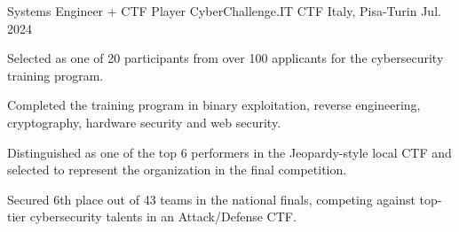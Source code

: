 

\begin{cventries}

  \cventry
    {Systems Engineer + CTF Player} %
    {CyberChallenge.IT CTF} %
    {Italy, Pisa-Turin} %
    {Jul. 2024} %
    {
      \begin{cvitems} %
        \item {Selected as one of 20 participants from over 100 applicants for the cybersecurity training program.}
        \item {Completed the training program in binary exploitation, reverse engineering, cryptography, hardware security and web security.}
        \item {Distinguished as one of the top 6 performers in the Jeopardy-style local CTF and selected to represent the organization in the final competition.}
        \item {Secured 6th place out of 43 teams in the national finals, competing against top-tier cybersecurity talents in an Attack/Defense CTF.}
      \end{cvitems}
    }

\end{cventries}
